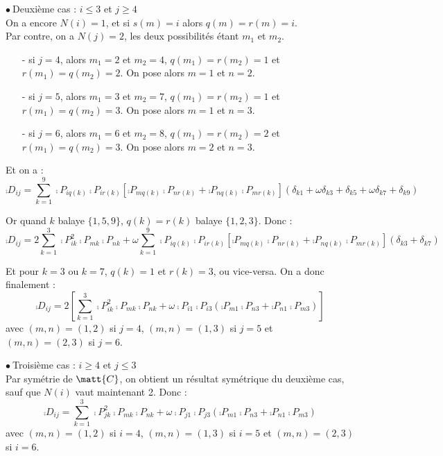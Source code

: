 \vspace{1cm}
$\bullet\ ${\sc Deuxi\`eme cas} : $i\leqslant 3$ et $j\geqslant 4$\\
On a encore $N(i)=1$, et si $s(m)=i$ alors $q(m)=r(m)=i$.\\
Par contre, on a $N(j)=2$, les deux possibilit\'es \'etant $m_1$ et $m_2$.\\
\begin{itemize}
\item[-] si $j=4$, alors $m_1=2$ et $m_2=4$,
$q(m_1)=r(m_2)=1$ et $r(m_1)=q(m_2)=2$. On pose alors
$m=1$ et $n=2$.

\item[-] si $j=5$, alors $m_1=3$ et $m_2=7$,
$q(m_1)=r(m_2)=1$ et $r(m_1)=q(m_2)=3$. On pose alors
$m=1$ et $n=3$.

\item[-] si $j=6$, alors $m_1=6$ et $m_2=8$,
$q(m_1)=r(m_2)=2$ et $r(m_1)=q(m_2)=3$. On pose alors
$m=2$ et $n=3$.
\end{itemize}

Et on a :
\begin{equation}
\comp{D}_{ij}=\sum_{k=1}^9
\comp{P}_{iq(k)}\comp{P}_{ir(k)}\left[
\comp{P}_{mq(k)}\comp{P}_{nr(k)}+\comp{P}_{nq(k)}\comp{P}_{mr(k)}\right]
(\delta_{k1}+\omega\delta_{k3}+\delta_{k5}+\omega\delta_{k7}+\delta_{k9})
\end{equation}

Or quand $k$ balaye $\{1,5,9\}$, $q(k)=r(k)$ balaye $\{1,2,3\}$. Donc :
\begin{equation}
\comp{D}_{ij}=2\sum_{k=1}^3
\comp{P}_{ik}^2\comp{P}_{mk}\comp{P}_{nk}
+\omega\sum_{k=1}^9
\comp{P}_{iq(k)}\comp{P}_{ir(k)}\left[
\comp{P}_{mq(k)}\comp{P}_{nr(k)}+\comp{P}_{nq(k)}\comp{P}_{mr(k)}\right]
(\delta_{k3}+\delta_{k7})
\end{equation}

Et pour $k=3$ ou $k=7$, $q(k)=1$ et $r(k)=3$, ou vice-versa. On a donc
finalement :
\begin{equation}
\comp{D}_{ij}=2\left[\sum_{k=1}^3
\comp{P}_{ik}^2\comp{P}_{mk}\comp{P}_{nk}
+\omega\comp{P}_{i1}\comp{P}_{i3}\left(
\comp{P}_{m1}\comp{P}_{n3}+\comp{P}_{n1}\comp{P}_{m3}\right)
\right]
\end{equation}
avec $(m,n)=(1,2)$ si $j=4$, $(m,n)=(1,3)$ si $j=5$ et $(m,n)=(2,3)$ si
$j=6$.

\vspace{1cm}
$\bullet\ ${\sc Troisi\`eme cas} : $i\geqslant 4$ et $j\leqslant 3$\\
Par sym\'etrie de $\matt{C}$, on obtient un r\'esultat sym\'etrique du
deuxi\`eme cas, sauf que $N(i)$ vaut maintenant 2. Donc :
\begin{equation}
\comp{D}_{ij}=\sum_{k=1}^3
\comp{P}_{jk}^2\comp{P}_{mk}\comp{P}_{nk}
+\omega\comp{P}_{j1}\comp{P}_{j3}\left(
\comp{P}_{m1}\comp{P}_{n3}+\comp{P}_{n1}\comp{P}_{m3}\right)
\end{equation}
avec $(m,n)=(1,2)$ si $i=4$, $(m,n)=(1,3)$ si $i=5$ et $(m,n)=(2,3)$ si
$i=6$.

